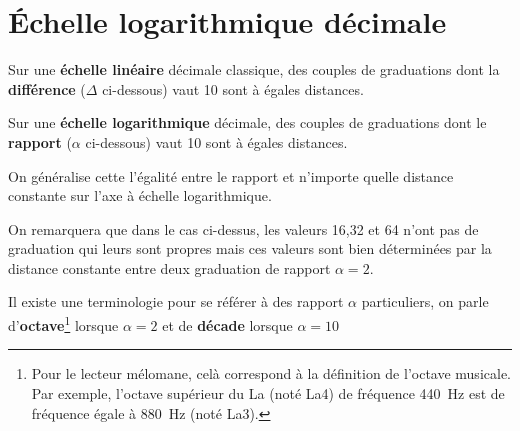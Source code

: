 \section{\'Echelle logarithmique décimale}
Sur une \textbf{échelle linéaire} décimale classique, des couples de 
graduations dont la \textbf{différence} ($\Delta$ ci-dessous) vaut 10 sont à 
égales distances. 
\begin{center}
    
\end{center}
Sur une \textbf{échelle logarithmique} décimale, des couples de graduations 
dont le \textbf{rapport} ($\alpha$ ci-dessous) vaut 10 sont à égales distances.
\begin{center}
    
\end{center}
On généralise cette l'égalité entre le rapport et n'importe quelle 
distance constante sur l'axe à échelle logarithmique.
\begin{center}
    
\end{center}
On remarquera que dans le cas ci-dessus, les valeurs 16,32 et 64 n'ont pas 
de graduation qui leurs sont propres mais ces valeurs sont bien déterminées 
par la distance constante entre deux graduation de rapport $\alpha=2$. 

Il existe une terminologie pour se référer à des rapport $\alpha$ particuliers,
on parle d'\textbf{octave}\footnote{Pour le lecteur mélomane, celà correspond à
la définition de l'octave musicale. Par exemple, l'octave supérieur du 
La (noté La4) de fréquence \SI{440}{\hertz} est de fréquence égale à 
\SI{880}{\hertz} (noté La3).} lorsque $\alpha=2$ et de \textbf{décade} 
lorsque $\alpha=10$

